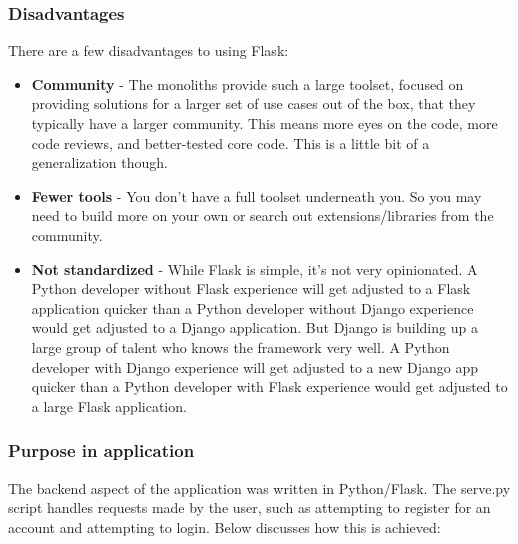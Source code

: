 \subsubsection{Disadvantages}
There are a few disadvantages to using Flask:

\begin{itemize}
    \item \textbf{Community} - The monoliths provide such a large toolset,
    focused on providing solutions for a larger set of use cases out of the box,
    that they typically have a larger community. This means more eyes on the
    code, more code reviews, and better-tested core code. This is a little bit
    of a generalization though.
    \item \textbf{Fewer tools} -  You don’t have a full toolset underneath you.
    So you may need to build more on your own or search out extensions/libraries
    from the community.
    \item \textbf{Not standardized} - While Flask is simple, it’s
    not very opinionated. A Python developer without Flask experience will get 
    adjusted to a Flask application quicker than a Python developer without 
    Django experience would get adjusted to a Django application. But Django is 
    building up a large group of talent who knows the framework very well. A 
    Python developer with Django experience will get adjusted to a new Django 
    app quicker than a Python developer with Flask experience would get adjusted
    to a large Flask application.
\end{itemize}

\newpage
\subsubsection{Purpose in application}
The backend aspect of the application was written in Python/Flask. The serve.py script handles requests made by the user, such as attempting to register for an account and attempting to login. Below discusses how this is achieved:

